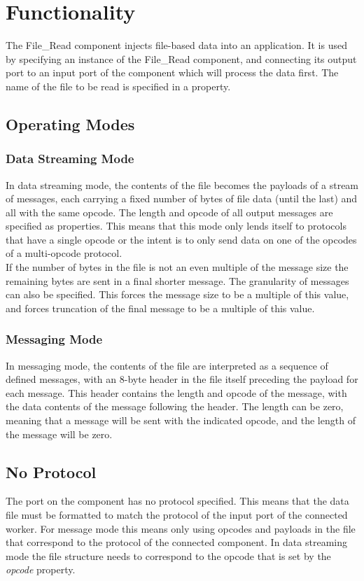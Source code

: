 \documentclass{article}
\begin{document}
\section*{Functionality}
\begin{flushleft}
The File\_Read component injects file-based data into an application. It is used
by specifying an instance of the File\_Read component, and connecting its output port to
an input port of the component which will process the data first. The name of the file to
be read is specified in a property.
\subsection*{Operating Modes}
\subsubsection*{Data Streaming Mode}
In data streaming mode, the contents of the file becomes the payloads of a stream of
messages, each carrying a fixed number of bytes of file data (until the last) and all with
the same opcode. The length and opcode of all output messages are specified as
properties. This means that this mode only lends itself to protocols that have a single opcode or the intent is to only send data on one of the opcodes of a multi-opcode protocol.\\ \medskip \medskip 
If the number of bytes in the file is not an even multiple of the message size the
remaining bytes are sent in a final shorter message. The granularity of messages can
also be specified. This forces the message size to be a multiple of this value, and
forces truncation of the final message to be a multiple of this value.
\subsubsection*{Messaging Mode}
In messaging mode, the contents of the file are interpreted as a sequence of defined
messages, with an 8-byte header in the file itself preceding the payload for each message.
This header contains the length and opcode of the message, with the data contents of
the message following the header. The length can be zero, meaning that a message
will be sent with the indicated opcode, and the length of the message will be zero.\\
\medskip \medskip 
 
\subsection*{No Protocol}
The port on the component has no protocol specified.  This means that the data file must be formatted to match the protocol of the input port of the connected worker.  For message mode this means only using opcodes and payloads in the file that correspond to the protocol of the connected component.  In data streaming mode the file structure needs to correspond to the opcode that is set by the \textit{opcode} property.   

\end{flushleft}
\end{document}
